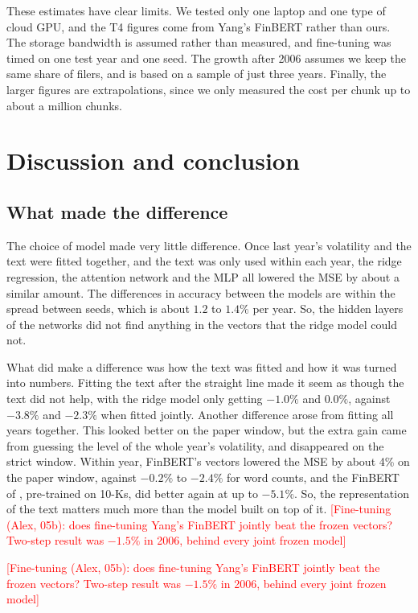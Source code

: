 \documentclass[11pt,a4paper]{article}
\newcommand{\placeholder}[1]{\textcolor{red}{[#1]}}
\begin{document}
These estimates have clear limits. We tested only one laptop and one type of cloud GPU, and the T4 figures come from Yang's FinBERT rather than ours. The storage bandwidth is assumed rather than measured, and fine-tuning was timed on one test year and one seed. The growth after 2006 assumes we keep the same share of filers, and is based on a sample of just three years. Finally, the larger figures are extrapolations, since we only measured the cost per chunk up to about a million chunks.

\section{Discussion and conclusion}\label{sec:conclusion}

\subsection{What made the difference}

The choice of model made very little difference. Once last year's volatility and the text were fitted together, and the text was only used within each year, the ridge regression, the attention network and the MLP all lowered the MSE by about a similar amount. The differences in accuracy between the models are within the spread between seeds, which is about $1.2$ to $1.4\%$ per year. So, the hidden layers of the networks did not find anything in the vectors that the ridge model could not.

What did make a difference was how the text was fitted and how it was turned into numbers. Fitting the text after the straight line made it seem as though the text did not help, with the ridge model only getting $-1.0\%$ and $0.0\%$, against $-3.8\%$ and $-2.3\%$ when fitted jointly. Another difference arose from fitting all years together. This looked better on the paper window, but the extra gain came from guessing the level of the whole year's volatility, and disappeared on the strict window. Within year, FinBERT's vectors lowered the MSE by about 4\% on the paper window, against $-0.2\%$ to $-2.4\%$ for word counts, and the FinBERT of \citet{yang2020}, pre-trained on 10-Ks, did better again at up to $-5.1\%$. So, the representation of the text matters much more than the model built on top of it.
\placeholder{Fine-tuning (Alex, 05b): does fine-tuning Yang's FinBERT jointly beat the frozen vectors? Two-step result was $-1.5\%$ in 2006, behind every joint frozen model}

\placeholder{Fine-tuning (Alex, 05b): does fine-tuning Yang's FinBERT jointly beat the frozen vectors? Two-step result was $-1.5\%$ in 2006, behind every joint frozen model}
\end{document}
